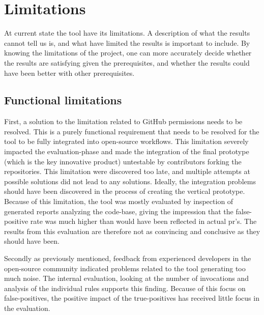 \documentclass[pdftex,10pt,b5paper,twoside]{report}
\begin{document}
\section{Limitations}
At current state the tool have its limitations. A description of what the results cannot tell us is, and what have limited the results is important to include. By knowing the limitations of the project, one can more accurately decide whether the results are satisfying given the prerequisites, and whether the results could have been better with other prerequisites. 

\subsection*{Functional limitations}
First, a solution to the limitation related to GitHub permissions needs to be resolved. This is a purely functional requirement that needs to be resolved for the tool to be fully integrated into open-source workflows. This limitation severely impacted the evaluation-phase and made the integration of the final prototype (which is the key innovative product) untestable by contributors forking the repositories. This limitation were discovered too late, and multiple attempts at possible solutions did not lead to any solutions. Ideally, the integration problems should have been discovered in the process of creating the vertical prototype. Because of this limitation, the tool was mostly evaluated by inspection of generated reports analyzing the code-base, giving the impression that the false-positive rate was much higher than would have been reflected in actual \gls{pr}'s. The results from this evaluation are therefore not as convincing and conclusive as they should have been.

Secondly as previously mentioned, feedback from experienced developers in the open-source community indicated problems related to the tool generating too much noise. The internal evaluation, looking at the number of invocations and analysis of the individual rules supports this finding. Because of this focus on false-positives, the positive impact of the true-positives has received little focus in the evaluation.  
\end{document}
